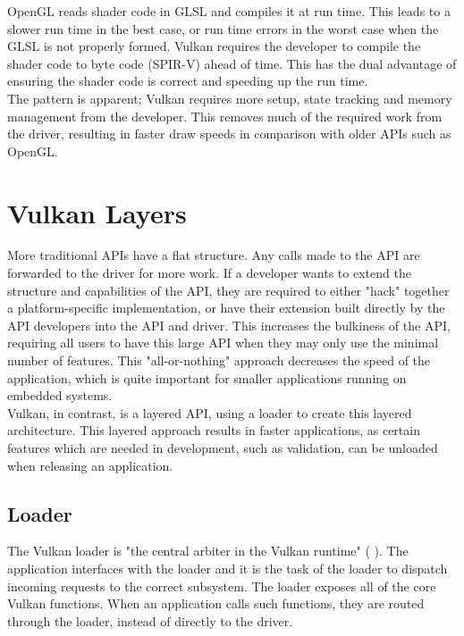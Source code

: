\documentclass[12pt]{report}
\newcommand{\citebu}[1]{(\citenoparen{#1})}
\newcommand{\citenoparen}[1]{\citeauthor{#1} \citeyear{#1}}
\theoremstyle{definition}
\begin{document}
      OpenGL reads shader code in GLSL and compiles it at run time. This leads
      to a slower run time in the best case, or run time errors in the worst
      case when the GLSL is not properly formed. Vulkan requires the developer
      to compile the shader code to byte code (SPIR-V) ahead of time. 
      This has the dual advantage of ensuring the shader
      code is correct and speeding up the run time. \\

      The pattern is apparent; Vulkan requires more setup, state tracking and
      memory management from the developer. This removes much of the required
      work from the driver, resulting in faster draw speeds in comparison
      with older APIs such as OpenGL.

    \section{Vulkan Layers}

      More traditional APIs have a flat structure. Any calls made to the API are
      forwarded to the driver for more work. If a developer wants to extend the
      structure and capabilities of the API, they are required to either "hack"
      together a platform-specific implementation, or have their extension
      built directly by the API developers into the API and driver. This
      increases the bulkiness of the API, requiring all users to have
      this large API when they may only use the minimal number of features.
      This "all-or-nothing" approach decreases the speed of the application,
      which is quite important for smaller applications running on embedded
      systems. \\

      Vulkan, in contrast, is a layered API, using a loader to create this
      layered architecture. This layered approach results in faster
      applications, as certain features which are needed in development,
      such as validation, can be unloaded when releasing an application.

      \subsection{Loader}

      The Vulkan loader is "the central arbiter in the Vulkan runtime" \citebu{renderdoc}.
      The application interfaces with the loader and it is the task of the
      loader to dispatch incoming requests to the correct subsystem. The
      loader exposes all of the core Vulkan functions. When an application
      calls such functions, they are routed through the loader, instead of
      directly to the driver. \\
\end{document}
